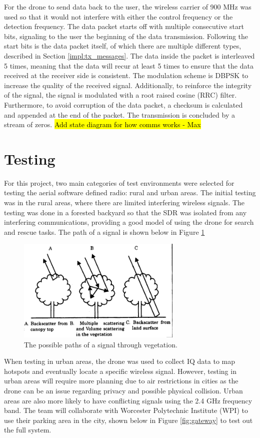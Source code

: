 For the drone to send data back to the user, the wireless carrier of 900 MHz was used so that it would not interfere with either the control frequency or the detection frequency. The data packet starts off with multiple consecutive start bits, signaling to the user the beginning of the data transmission. Following the start bits is the data packet itself, of which there are multiple different types, described in Section \ref{impl:tx_messages}. The data inside the packet is interleaved 5 times, meaning that the data will recur at least 5 times to ensure that the data received at the receiver side is consistent. The modulation scheme is DBPSK to increase the quality of the received signal. Additionally, to reinforce the integrity of the signal, the signal is modulated with a root raised cosine (RRC) filter. Furthermore, to avoid corruption of the data packet, a checksum is calculated and appended at the end of the packet. The transmission is concluded by a stream of zeros. \hl{Add state diagram for how comms works - Max}\par

\section{Testing}
For this project, two main categories of test environments were selected for testing the aerial software defined radio: rural and urban areas. The initial testing was in the rural areas, where there are limited interfering wireless signals. The testing was done in a forested backyard so that the SDR was isolated from any interfering communications, providing a good model of using the drone for search and rescue tasks. The path of a signal is shown below in Figure \ref{fig:tree}
\begin{figure}[ht!]
	\centering
	\includegraphics[width=0.70\textwidth]{img/Pathloss_tree}
	\caption{The possible paths of a signal through vegetation. \cite{backscatter}}
	\label{fig:tree}
\end{figure}\par
When testing in urban areas, the drone was used to collect IQ data to map hotspots and eventually locate a specific wireless signal. However, testing in urban areas will require more planning due to air restrictions in cities as the drone can be an issue regarding privacy and possible physical collision. Urban areas are also more likely to have conflicting signals using the 2.4 GHz frequency band. The team will collaborate with Worcester Polytechnic Institute (WPI) to use their parking area in the city, shown below in Figure \ref{fig:gateway} to test out the full system.\par

